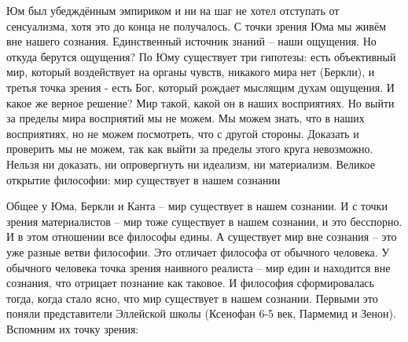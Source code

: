 Юм был убедждённым эмпириком и ни на шаг не хотел отступать от сенсуализма, хотя это до конца не получалось. С точки зрения Юма мы живём вне нашего сознания. Единственный источник знаний – наши ощущения. Но откуда берутся ощущения? По Юму существует три гипотезы: есть объективный мир, который воздействует на органы чувств, никакого мира нет (Беркли), и третья точка зрения - есть Бог, который рождает мыслящим духам ощущения. И какое же верное решение? Мир такой, какой он в наших восприятиях. Но выйти за пределы мира восприятий мы не можем. Мы можем знать, что в наших восприятиях, но не можем посмотреть, что с другой стороны. Доказать и проверить мы не можем, так как выйти за пределы этого круга невозможно. Нельзя ни доказать, ни опровергнуть ни идеализм, ни материализм.
Великое открытие философии: мир существует в нашем сознании

Общее у Юма, Беркли и Канта – мир существует в нашем сознании. И с точки зрения материалистов – мир тоже существует в нашем сознании, и это бесспорно. И в этом отношении все философы едины. А существует мир вне сознания – это уже разные ветви философии. Это отличает философа от обычного человека. У обычного человека точка зрения наивного реалиста – мир един и находится вне сознания, что отрицает познание как таковое. И философия сформировалась тогда, когда стало ясно, что мир существует в нашем сознании. Первыми это поняли представители Эллейской школы (Ксенофан 6-5 век, Пармемид и Зенон). Вспомним их точку зрения:

